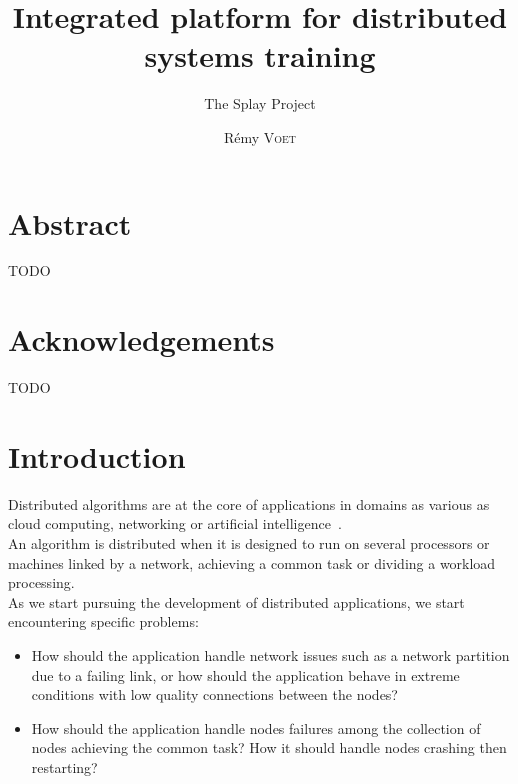 \documentclass{eplmastersthesis}
\title{Integrated platform for distributed systems training}
\subtitle{The Splay Project}
\author{Rémy \textsc{Voet}}
\begin{document}
  \maketitle

  \chapter*{Abstract}
  {\color{red} TODO}

  \chapter*{Acknowledgements}
  {\color{red} TODO}

  \tableofcontents

  \chapter{Introduction}



    Distributed algorithms are at the core of applications in domains as
    various as cloud computing, networking or artificial
    intelligence~\cite{DistributedArtificialIntelligence}.\\
    An algorithm is distributed when it is designed to run on several
    processors or machines linked by a network, achieving a common task
    or dividing a workload processing.\\

    As we start pursuing the development of distributed applications,
    we start encountering specific problems:
    \begin{itemize}
      \item How should the application handle network issues such as
      a network partition due to a failing link, or how should the application
      behave in extreme conditions with low quality connections between
      the nodes?
      \item How should the application handle nodes failures among the
      collection of nodes achieving the common task? How it should handle
      nodes crashing then restarting?
    \end{itemize}
\end{document}
